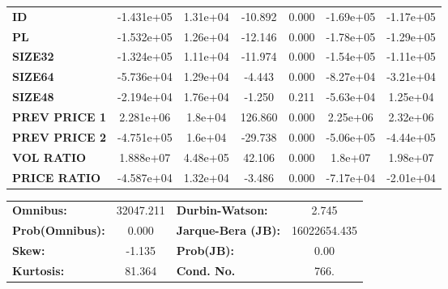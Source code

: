 \begin{center}
\begin{tabular}{lcccccc}
\textbf{ID}    &   -1.431e+05  &     1.31e+04     &   -10.892  &         0.000        &    -1.69e+05    &    -1.17e+05     \\
\textbf{PL}    &   -1.532e+05  &     1.26e+04     &   -12.146  &         0.000        &    -1.78e+05    &    -1.29e+05     \\
\textbf{SIZE32}    &   -1.324e+05  &     1.11e+04     &   -11.974  &         0.000        &    -1.54e+05    &    -1.11e+05     \\
\textbf{SIZE64}   &   -5.736e+04  &     1.29e+04     &    -4.443  &         0.000        &    -8.27e+04    &    -3.21e+04     \\
\textbf{SIZE48}   &   -2.194e+04  &     1.76e+04     &    -1.250  &         0.211        &    -5.63e+04    &     1.25e+04     \\
\textbf{PREV PRICE 1}   &    2.281e+06  &      1.8e+04     &   126.860  &         0.000        &     2.25e+06    &     2.32e+06     \\
\textbf{PREV PRICE 2}   &   -4.751e+05  &      1.6e+04     &   -29.738  &         0.000        &    -5.06e+05    &    -4.44e+05     \\
\textbf{VOL RATIO}   &    1.888e+07  &     4.48e+05     &    42.106  &         0.000        &      1.8e+07    &     1.98e+07     \\
\textbf{PRICE RATIO}   &   -4.587e+04  &     1.32e+04     &    -3.486  &         0.000        &    -7.17e+04    &    -2.01e+04     \\
\bottomrule
\end{tabular}
\begin{tabular}{lclc}
\textbf{Omnibus:}       & 32047.211 & \textbf{  Durbin-Watson:     } &      2.745    \\
\textbf{Prob(Omnibus):} &    0.000  & \textbf{  Jarque-Bera (JB):  } & 16022654.435  \\
\textbf{Skew:}          &   -1.135  & \textbf{  Prob(JB):          } &       0.00    \\
\textbf{Kurtosis:}      &   81.364  & \textbf{  Cond. No.          } &       766.    \\
\bottomrule
\end{tabular}
\end{center}